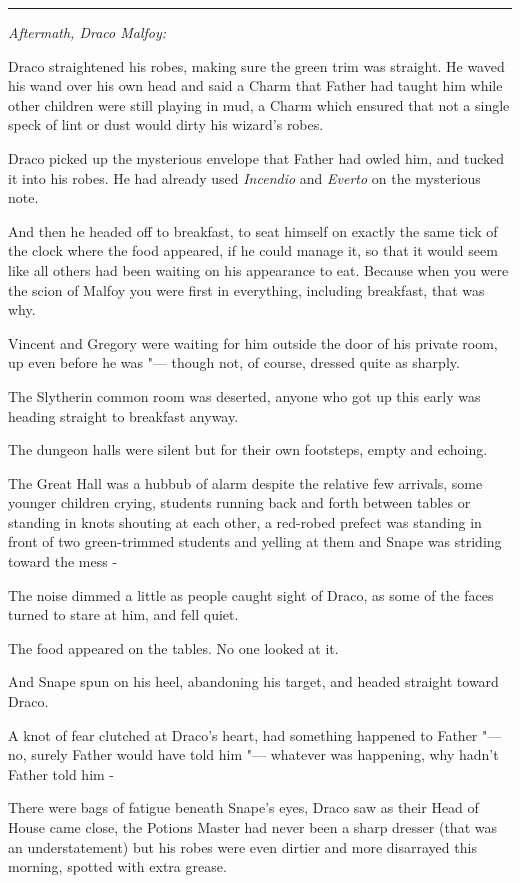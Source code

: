 \begin{center}\rule{3in}{0.4pt}\end{center}

\emph{Aftermath, Draco Malfoy:}

Draco straightened his robes, making sure the green trim was straight.
He waved his wand over his own head and said a Charm that Father had
taught him while other children were still playing in mud, a Charm which
ensured that not a single speck of lint or dust would dirty his wizard's
robes.

Draco picked up the mysterious envelope that Father had owled him, and
tucked it into his robes. He had already used \emph{Incendio} and
\emph{Everto} on the mysterious note.

And then he headed off to breakfast, to seat himself on exactly the same
tick of the clock where the food appeared, if he could manage it, so
that it would seem like all others had been waiting on his appearance to
eat. Because when you were the scion of Malfoy you were first in
everything, including breakfast, that was why.

Vincent and Gregory were waiting for him outside the door of his private
room, up even before he was "--- though not, of course, dressed quite as
sharply.

The Slytherin common room was deserted, anyone who got up this early was
heading straight to breakfast anyway.

The dungeon halls were silent but for their own footsteps, empty and
echoing.

The Great Hall was a hubbub of alarm despite the relative few arrivals,
some younger children crying, students running back and forth between
tables or standing in knots shouting at each other, a red-robed prefect
was standing in front of two green-trimmed students and yelling at them
and Snape was striding toward the mess -

The noise dimmed a little as people caught sight of Draco, as some of
the faces turned to stare at him, and fell quiet.

The food appeared on the tables. No one looked at it.

And Snape spun on his heel, abandoning his target, and headed straight
toward Draco.

A knot of fear clutched at Draco's heart, had something happened to
Father "--- no, surely Father would have told him "--- whatever was happening,
why hadn't Father told him -

There were bags of fatigue beneath Snape's eyes, Draco saw as their Head
of House came close, the Potions Master had never been a sharp dresser
(that was an understatement) but his robes were even dirtier and more
disarrayed this morning, spotted with extra grease.

